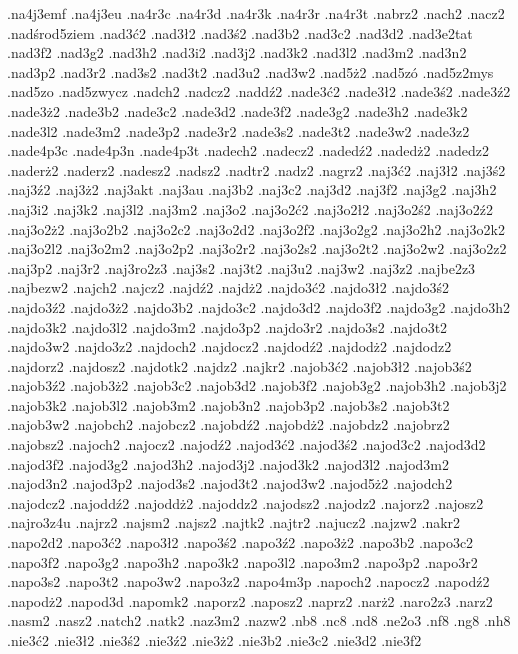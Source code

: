 {.na4j3emf
.na4j3eu
.na4r3c
.na4r3d
.na4r3k
.na4r3r
.na4r3t
.nabrz2
.nach2
.nacz2
.nad\'srod5ziem
.nad3\'c2
.nad3\l 2
.nad3\'s2
.nad3b2
.nad3c2
.nad3d2
.nad3e2tat
.nad3f2
.nad3g2
.nad3h2
.nad3i2
.nad3j2
.nad3k2
.nad3l2
.nad3m2
.nad3n2
.nad3p2
.nad3r2
.nad3s2
.nad3t2
.nad3u2
.nad3w2
.nad5\.z2
.nad5z\'o
.nad5z2mys
.nad5zo
.nad5zwycz
.nadch2
.nadcz2
.nadd\'z2
.nade3\'c2
.nade3\l 2
.nade3\'s2
.nade3\'z2
.nade3\.z2
.nade3b2
.nade3c2
.nade3d2
.nade3f2
.nade3g2
.nade3h2
.nade3k2
.nade3l2
.nade3m2
.nade3p2
.nade3r2
.nade3s2
.nade3t2
.nade3w2
.nade3z2
.nade4p3c
.nade4p3n
.nade4p3t
.nadech2
.nadecz2
.naded\'z2
.naded\.z2
.nadedz2
.nader\.z2
.naderz2
.nadesz2
.nadsz2
.nadtr2
.nadz2
.nagrz2
.naj3\'c2
.naj3\l 2
.naj3\'s2
.naj3\'z2
.naj3\.z2
.naj3akt
.naj3au
.naj3b2
.naj3c2
.naj3d2
.naj3f2
.naj3g2
.naj3h2
.naj3i2
.naj3k2
.naj3l2
.naj3m2
.naj3o2
.naj3o2\'c2
.naj3o2\l 2
.naj3o2\'s2
.naj3o2\'z2
.naj3o2\.z2
.naj3o2b2
.naj3o2c2
.naj3o2d2
.naj3o2f2
.naj3o2g2
.naj3o2h2
.naj3o2k2
.naj3o2l2
.naj3o2m2
.naj3o2p2
.naj3o2r2
.naj3o2s2
.naj3o2t2
.naj3o2w2
.naj3o2z2
.naj3p2
.naj3r2
.naj3ro2z3
.naj3s2
.naj3t2
.naj3u2
.naj3w2
.naj3z2
.najbe2z3
.najbezw2
.najch2
.najcz2
.najd\'z2
.najd\.z2
.najdo3\'c2
.najdo3\l 2
.najdo3\'s2
.najdo3\'z2
.najdo3\.z2
.najdo3b2
.najdo3c2
.najdo3d2
.najdo3f2
.najdo3g2
.najdo3h2
.najdo3k2
.najdo3l2
.najdo3m2
.najdo3p2
.najdo3r2
.najdo3s2
.najdo3t2
.najdo3w2
.najdo3z2
.najdoch2
.najdocz2
.najdod\'z2
.najdod\.z2
.najdodz2
.najdorz2
.najdosz2
.najdotk2
.najdz2
.najkr2
.najob3\'c2
.najob3\l 2
.najob3\'s2
.najob3\'z2
.najob3\.z2
.najob3c2
.najob3d2
.najob3f2
.najob3g2
.najob3h2
.najob3j2
.najob3k2
.najob3l2
.najob3m2
.najob3n2
.najob3p2
.najob3s2
.najob3t2
.najob3w2
.najobch2
.najobcz2
.najobd\'z2
.najobd\.z2
.najobdz2
.najobrz2
.najobsz2
.najoch2
.najocz2
.najod\'z2
.najod3\'c2
.najod3\'s2
.najod3c2
.najod3d2
.najod3f2
.najod3g2
.najod3h2
.najod3j2
.najod3k2
.najod3l2
.najod3m2
.najod3n2
.najod3p2
.najod3s2
.najod3t2
.najod3w2
.najod5\.z2
.najodch2
.najodcz2
.najodd\'z2
.najodd\.z2
.najoddz2
.najodsz2
.najodz2
.najorz2
.najosz2
.najro3z4u
.najrz2
.najsm2
.najsz2
.najtk2
.najtr2
.najucz2
.najzw2
.nakr2
.napo2d2
.napo3\'c2
.napo3\l 2
.napo3\'s2
.napo3\'z2
.napo3\.z2
.napo3b2
.napo3c2
.napo3f2
.napo3g2
.napo3h2
.napo3k2
.napo3l2
.napo3m2
.napo3p2
.napo3r2
.napo3s2
.napo3t2
.napo3w2
.napo3z2
.napo4m3p
.napoch2
.napocz2
.napod\'z2
.napod\.z2
.napod3d
.napomk2
.naporz2
.naposz2
.naprz2
.nar\.z2
.naro2z3
.narz2
.nasm2
.nasz2
.natch2
.natk2
.naz3m2
.nazw2
.nb8
.nc8
.nd8
.ne2o3
.nf8
.ng8
.nh8
.nie3\'c2
.nie3\l 2
.nie3\'s2
.nie3\'z2
.nie3\.z2
.nie3b2
.nie3c2
.nie3d2
.nie3f2
}
